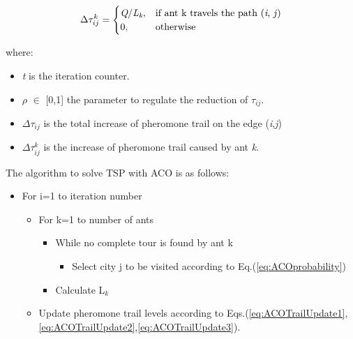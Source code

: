 \documentclass[twocolumn]{article}
\begin{document}
	\begin{equation} \label{eq:ACOTrailUpdate3}
	\Delta\tau_{ij}^k = 
	\begin{cases}
	\textit{Q}/\textit{L}_\textit{k},& \text{if ant k travels the path (\textit{i}, \textit{j})}
	\\
	0,& \text{otherwise}
	\end{cases}
	\end{equation}
	
	where:
	\begin{itemize}
		\renewcommand{\labelitemi}{-}
		\item \textit{t} is the iteration counter.
		\item $\rho$ $\in$ [0,1] the parameter to regulate the reduction of $\tau_{ij}$.
		\item $\Delta\tau_{ij}$ is the total increase of pheromone trail on the edge (\textit{i},\textit{j})
		\item $\Delta\tau_{ij}^k$ is the increase of pheromone trail caused by ant \textit{k}.
	\end{itemize}	
	The algorithm to solve TSP with ACO is as follows:
	
	\begin{itemize}
		\item For i=1 to iteration number
		\begin{itemize}
		\item For k=1 to number of ants
			\begin{itemize}
			\item While no complete tour is found by ant k
				\begin{itemize}
				\item Select city j to be visited according to Eq.(\ref{eq:ACOprobability})
				\end{itemize}
			\item Calculate L$_k$
			\end{itemize}
		\item Update pheromone trail levels according to Eqs.(\ref{eq:ACOTrailUpdate1},\ref{eq:ACOTrailUpdate2},\ref{eq:ACOTrailUpdate3}).
		\end{itemize}
	\end{itemize}
	
\end{document}
